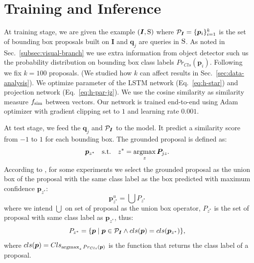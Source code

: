 \section{Training and Inference}
\label{sec:training-and-inference}

At training stage, we are given the example $(\bm{I}, \mathrm{S})$ where
$\mathcal{P}_{\bm{I}} = \{ \bm{p}_i \}^k_{i=1}$ is the set of bounding box
proposals built on $\bm{I}$ and $\bm{q}_j$ are queries in $\mathrm{S}$. As
noted in Sec.~\ref{subsec:visual-branch} we use extra information from
object detector such us the probability distribution on bounding box
class labels $Pr_{Cls}(\bm{p}_i)$. Following \cite{chen2018knowledge}
we fix $k = 100$ proposals. (We studied how $k$ can affect results in
Sec.~\ref{sec:data-analysis}). We optimize parameter of the LSTM
network (Eq.~\ref{eq:h-star}) and projection network
(Eq.~\ref{eq:h-par-jz}). We use the cosine similarity as similarity
measure $f_{\text{sim}}$ between vectors. Our network is trained end-to-end
using Adam optimizer with gradient clipping set to $1$ and learning
rate $0.001$.

At test stage, we feed the $\bm{q}_j$ and $\mathcal{P}_{\bm{I}}$ to the
model. It predict a similarity score from $-1$ to $1$ for each
bounding box. The grounded proposal is defined as:
\begin{equation}
  \bm{p}_{z^*} \quad \text{s.t.} \quad z^* = \operatorname*{argmax}_z \bm{P}_{jz}.
\end{equation}
According to \cite{wang2019phrase}, for some experiments we select the
grounded proposal as the union box of the proposal with the same class
label as the box predicted with maximum confidence $\bm{p}_{z^*}$:
\begin{equation}
  \bm{p}^u_{z^*} = \bigcup P_{z^*}
\end{equation}
where we intend $\bigcup$ on set of proposal as the union box
operator, $P_{z^*}$ is the set of proposal with same class label as
$\bm{p}_{z^*}$, thus:
\begin{equation}
  P_{z^*} = \{ \bm{p} \mid \bm{p} \in \mathcal{P}_{\bm{I}} \land cls(\bm{p}) = cls(\bm{p}_{z^*}) \},
\end{equation}
where $cls(\bm{p}) = Cls_{\operatorname*{argmax}_z Pr_{Cls}(\bm{p})}$ is the function
that returns the class label of a proposal.
